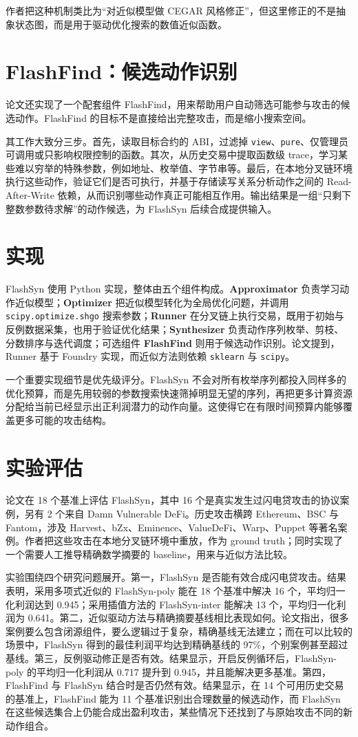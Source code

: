 \documentclass[UTF8,11pt]{ctexart}
\begin{document}
作者把这种机制类比为“对近似模型做 CEGAR 风格修正”，但这里修正的不是抽象状态图，而是用于驱动优化搜索的数值近似函数。

\section{FlashFind：候选动作识别}
论文还实现了一个配套组件 FlashFind，用来帮助用户自动筛选可能参与攻击的候选动作。FlashFind 的目标不是直接给出完整攻击，而是缩小搜索空间。

其工作大致分三步。首先，读取目标合约的 ABI，过滤掉 \texttt{view}、\texttt{pure}、仅管理员可调用或只影响权限控制的函数。其次，从历史交易中提取函数级 trace，学习某些难以穷举的特殊参数，例如地址、枚举值、字节串等。最后，在本地分叉链环境执行这些动作，验证它们是否可执行，并基于存储读写关系分析动作之间的 Read-After-Write 依赖，从而识别哪些动作真正可能相互作用。输出结果是一组“只剩下整数参数待求解”的动作候选，为 FlashSyn 后续合成提供输入。

\section{实现}
FlashSyn 使用 Python 实现，整体由五个组件构成。\textbf{Approximator} 负责学习动作近似模型；\textbf{Optimizer} 把近似模型转化为全局优化问题，并调用 \texttt{scipy.optimize.shgo} 搜索参数；\textbf{Runner} 在分叉链上执行交易，既用于初始与反例数据采集，也用于验证优化结果；\textbf{Synthesizer} 负责动作序列枚举、剪枝、分数排序与迭代调度；可选组件 \textbf{FlashFind} 则用于候选动作识别。论文提到，Runner 基于 Foundry 实现，而近似方法则依赖 \texttt{sklearn} 与 \texttt{scipy}。

一个重要实现细节是优先级评分。FlashSyn 不会对所有枚举序列都投入同样多的优化预算，而是先用较弱的参数搜索快速筛掉明显无望的序列，再把更多计算资源分配给当前已经显示出正利润潜力的动作向量。这使得它在有限时间预算内能够覆盖更多可能的攻击结构。

\section{实验评估}
论文在 18 个基准上评估 FlashSyn，其中 16 个是真实发生过闪电贷攻击的协议案例，另有 2 个来自 Damn Vulnerable DeFi。历史攻击横跨 Ethereum、BSC 与 Fantom，涉及 Harvest、bZx、Eminence、ValueDeFi、Warp、Puppet 等著名案例。作者把这些攻击在本地分叉链环境中重放，作为 ground truth；同时实现了一个需要人工推导精确数学摘要的 baseline，用来与近似方法比较。

实验围绕四个研究问题展开。第一，FlashSyn 是否能有效合成闪电贷攻击。结果表明，采用多项式近似的 FlashSyn-poly 能在 18 个基准中解决 16 个，平均归一化利润达到 0.945；采用插值方法的 FlashSyn-inter 能解决 13 个，平均归一化利润为 0.641。第二，近似驱动方法与精确摘要基线相比表现如何。论文指出，很多案例要么包含闭源组件，要么逻辑过于复杂，精确基线无法建立；而在可以比较的场景中，FlashSyn 得到的最佳利润平均达到精确基线的 97\%，个别案例甚至超过基线。第三，反例驱动修正是否有效。结果显示，开启反例循环后，FlashSyn-poly 的平均归一化利润从 0.717 提升到 0.945，并且能解决更多基准。第四，FlashFind 与 FlashSyn 结合时是否仍然有效。结果显示，在 14 个可用历史交易的基准上，FlashFind 能为 11 个基准识别出合理数量的候选动作，而 FlashSyn 在这些候选集合上仍能合成出盈利攻击，某些情况下还找到了与原始攻击不同的新动作组合。
\end{document}
